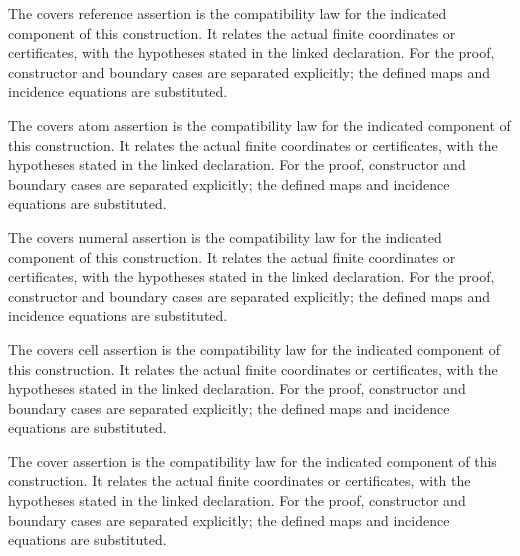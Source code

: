 The covers reference assertion is the compatibility law for the indicated component of this construction. It relates the actual finite coordinates or certificates, with the hypotheses stated in the linked declaration.
For the proof, constructor and boundary cases are separated explicitly; the defined maps and incidence equations are substituted.
\par{}

The covers atom assertion is the compatibility law for the indicated component of this construction. It relates the actual finite coordinates or certificates, with the hypotheses stated in the linked declaration.
For the proof, constructor and boundary cases are separated explicitly; the defined maps and incidence equations are substituted.
\par{}

The covers numeral assertion is the compatibility law for the indicated component of this construction. It relates the actual finite coordinates or certificates, with the hypotheses stated in the linked declaration.
For the proof, constructor and boundary cases are separated explicitly; the defined maps and incidence equations are substituted.
\par{}

The covers cell assertion is the compatibility law for the indicated component of this construction. It relates the actual finite coordinates or certificates, with the hypotheses stated in the linked declaration.
For the proof, constructor and boundary cases are separated explicitly; the defined maps and incidence equations are substituted.
\par{}

The cover assertion is the compatibility law for the indicated component of this construction. It relates the actual finite coordinates or certificates, with the hypotheses stated in the linked declaration.
For the proof, constructor and boundary cases are separated explicitly; the defined maps and incidence equations are substituted.
\par{}

